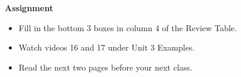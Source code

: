 \begin{center}
  {\large\bf Assignment}
\end{center}

\begin{itemize}
\item Fill in the bottom 3 boxes in column 4 of the Review Table. 
\item Watch   videos 16 and 17 under Unit 3 Examples.
\item Read the next two pages before your next class.
\end{itemize}
